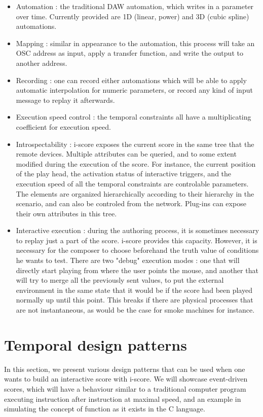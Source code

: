 \documentclass{article}
\begin{document}
\begin{itemize}
\item Automation : the traditional DAW automation, which writes in a parameter over time. Currently provided are 1D (linear, power) and 3D (cubic spline) automations.
\item Mapping : similar in appearance to the automation, this process will take an OSC address as input, apply a transfer function, and write the output to another address.
\item Recording : one can record either automations which will be able to apply automatic interpolation for numeric parameters, or record any kind of input message to replay it afterwards.
\item Execution speed control : the temporal constraints all have a multiplicating coefficient for execution speed.
\item Introspectability : i-score exposes the current score in the same tree that the remote devices. 
Multiple attributes can be queried, and to some extent modified during the execution of the score. 
For instance, the current position of the play head, the activation status of interactive triggers, and the execution speed of all the temporal constraints are controlable parameters.
The elements are organized hierarchically according to their hierarchy in the scenario, and can also be controled from the network.
Plug-ins can expose their own attributes in this tree.
\item Interactive execution : during the authoring process, it is sometimes necessary to replay just a part of the score.
i-score provides this capacity. 
However, it is necessary for the composer to choose beforehand the truth value of conditions he wants to test.
There are two "debug" execution modes : one that will directly start playing from where the user points the mouse, and another that will try to merge all the previously sent values, to put the external environment in the same state that it would be if the score had been played normally up until this point. 
This breaks if there are physical processes that are not instantaneous, as would be the case for smoke machines for instance.
\end{itemize}
\section{Temporal design patterns}
In this section, we present various design patterns that can be used 
when one wants to build an interactive score with i-score.
We will showcase event-driven scores, which will have a behaviour 
similar to a traditional computer program executing instruction after 
instruction at maximal speed, and an example in simulating the 
concept of function as it exists in the C language.
\end{document}
